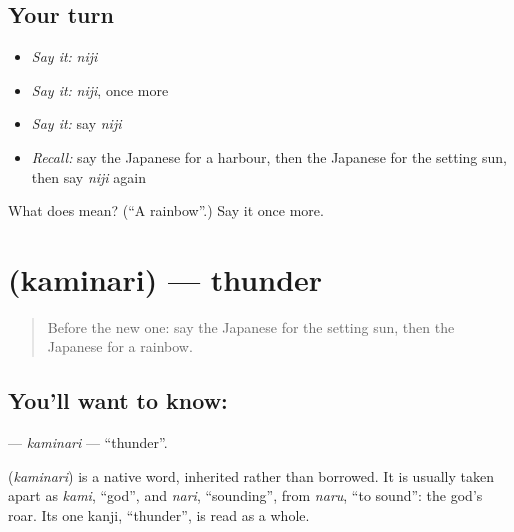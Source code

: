 \subsection*{Your turn}
\begin{itemize}
\raggedright
  \item \emph{Say it:} \emph{niji}
  \item \emph{Say it:} \emph{niji}, once more
  \item \emph{Say it:} say \emph{niji}
  \item \emph{Recall:} say the Japanese for a harbour, then the Japanese for the setting sun, then say \emph{niji} again
\end{itemize}

\begin{tcolorbox}[breakable,colback=teal!4,colframe=teal!35!black,title={Before you move on}]
What does  mean? (\textquotedblleft{}A rainbow\textquotedblright{}.) Say it once more.
\end{tcolorbox}
\section[\texorpdfstring{\ja{かみなり} (kaminari)}{かみなり (kaminari)}]{ (kaminari) — thunder}

\label{lesson:JA-C69-kaminari}



\begin{quote}
Before the new one: say the Japanese for the setting sun, then the Japanese for a rainbow.
\end{quote}

\subsection*{You'll want to know: }
\textbf{} — \emph{kaminari} — \textquotedblleft{}thunder\textquotedblright{}.

\begin{cousinweb}
\textbf{} (\emph{kaminari}) is a native word, inherited rather than borrowed. It is usually taken apart as \emph{kami}, \textquotedblleft{}god\textquotedblright{}, and \emph{nari}, \textquotedblleft{}sounding\textquotedblright{}, from \emph{naru}, \textquotedblleft{}to sound\textquotedblright{}: the god's roar. Its one kanji, \textquotedblleft{}thunder\textquotedblright{}, is read as a whole.
\end{cousinweb}

